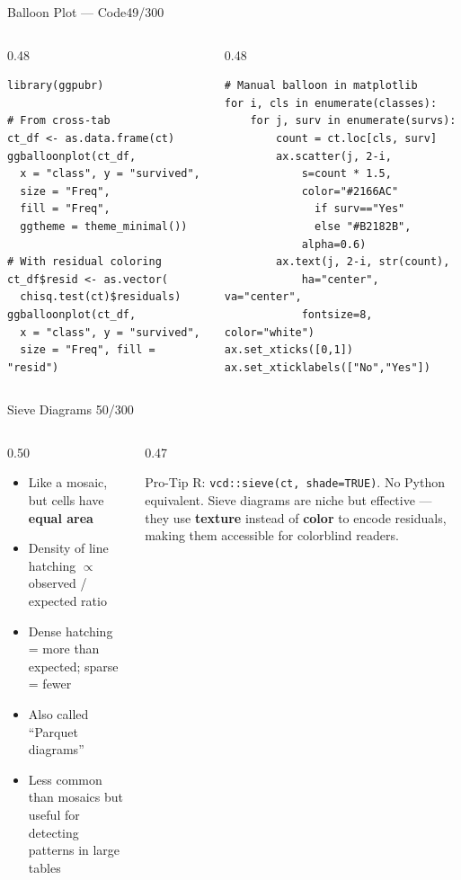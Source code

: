 \documentclass[10pt]{beamer}
\newcommand{\smark}[1]{\hfill{\scriptsize\color{codegray}#1}}
\begin{document}
\begin{frame}[fragile]{Balloon Plot --- Code}\smark{49/300}
\begin{columns}[T]
\begin{column}{0.48\textwidth}
\begin{lstlisting}[style=Rstyle]
library(ggpubr)

# From cross-tab
ct_df <- as.data.frame(ct)
ggballoonplot(ct_df,
  x = "class", y = "survived",
  size = "Freq",
  fill = "Freq",
  ggtheme = theme_minimal())

# With residual coloring
ct_df$resid <- as.vector(
  chisq.test(ct)$residuals)
ggballoonplot(ct_df,
  x = "class", y = "survived",
  size = "Freq", fill = "resid")
\end{lstlisting}
\end{column}
\begin{column}{0.48\textwidth}
\begin{lstlisting}[style=Pystyle]
# Manual balloon in matplotlib
for i, cls in enumerate(classes):
    for j, surv in enumerate(survs):
        count = ct.loc[cls, surv]
        ax.scatter(j, 2-i,
            s=count * 1.5,
            color="#2166AC"
              if surv=="Yes"
              else "#B2182B",
            alpha=0.6)
        ax.text(j, 2-i, str(count),
            ha="center", va="center",
            fontsize=8, color="white")
ax.set_xticks([0,1])
ax.set_xticklabels(["No","Yes"])
\end{lstlisting}
\end{column}
\end{columns}
\end{frame}

\begin{frame}{Sieve Diagrams}
\smark{50/300}
\begin{columns}[T]
\begin{column}{0.50\textwidth}
\begin{itemize}
    \item Like a mosaic, but cells have \textbf{equal area}
    \item Density of line hatching $\propto$ observed / expected ratio
    \item Dense hatching = more than expected; sparse = fewer
    \item Also called ``Parquet diagrams''
    \item Less common than mosaics but useful for detecting patterns in large tables
\end{itemize}
\end{column}
\begin{column}{0.47\textwidth}
\begin{alertblock}{Pro-Tip}
    \scriptsize R: \texttt{vcd::sieve(ct, shade=TRUE)}. No Python equivalent. Sieve diagrams are niche but effective --- they use \textbf{texture} instead of \textbf{color} to encode residuals, making them accessible for colorblind readers.
\end{alertblock}
\end{column}
\end{columns}
\end{frame}
\end{document}
